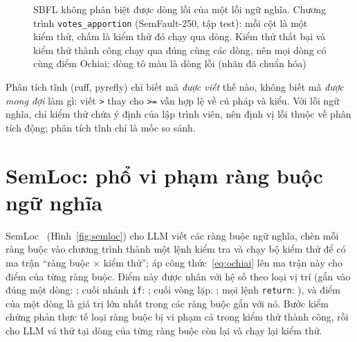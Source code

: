 \begin{figure}[H]
\centering

\caption{SBFL không phân biệt được dòng lỗi của một lỗi ngữ nghĩa. Chương trình \texttt{votes\_apportion} (SemFault-250, tập test): mỗi cột là một kiểm thử, chấm là kiểm thử đó chạy qua dòng. Kiểm thử thất bại và kiểm thử thành công chạy qua đúng cùng các dòng, nên mọi dòng có cùng điểm Ochiai; dòng tô màu là dòng lỗi (nhãn đã chuẩn hóa)}
\label{fig:sbfl-mu}
\end{figure}

\label{sec:tinh-dong}%
Phân tích tĩnh (ruff, pyrefly) chỉ biết mã \emph{được viết} thế nào, không biết mã \emph{được mong đợi} làm gì: viết
\texttt{>} thay cho \texttt{>=} vẫn hợp lệ về cú pháp và kiểu. Với lỗi ngữ nghĩa, chỉ kiểm thử chứa ý định của lập
trình viên, nên định vị lỗi thuộc về phân tích động; phân tích tĩnh chỉ là mốc so sánh.

\section{SemLoc: phổ vi phạm ràng buộc ngữ nghĩa}
\label{sec:semloc}

SemLoc~\cite{yang2026semloc} (Hình~\ref{fig:semloc}) cho LLM viết các ràng buộc ngữ nghĩa, chèn mỗi ràng buộc vào
chương trình thành một lệnh kiểm tra và chạy bộ kiểm thử để có ma trận ``ràng buộc $\times$ kiểm thử''; áp
công thức~\eqref{eq:ochiai} lên ma trận này cho điểm của từng ràng buộc. Điểm này được nhân với hệ số theo loại vị trí (gắn vào đúng một dòng: \ConstRegionWeightLine; cuối nhánh
\texttt{if}: \ConstRegionWeightAfterBranch; cuối vòng lặp: \ConstRegionWeightLoopTail; mọi lệnh \texttt{return}:
\ConstRegionWeightAnyReturn), và điểm của một dòng là giá trị lớn nhất trong các ràng buộc gắn với nó. Bước kiểm chứng
phản thực tế loại ràng buộc bị vi phạm cả trong kiểm thử thành công, rồi cho LLM vá thử tại dòng của từng ràng buộc còn
lại và chạy lại kiểm thử.

